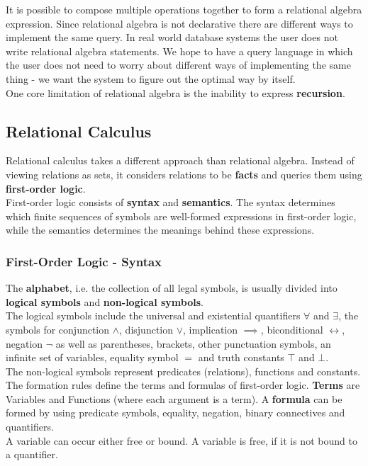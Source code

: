 It is possible to compose multiple operations together to form a relational algebra expression.
Since relational algebra is not declarative there are different ways to implement the same query. In real world database systems the user does not write relational algebra statements. We hope to have a query language in which the user does not need to worry about different ways of implementing the same thing - we want the system to figure out the optimal way by itself.\vspace{.2cm}\\
One core limitation of relational algebra is the inability to express \textbf{recursion}.

\subsection{Relational Calculus}
Relational calculus takes a different approach than relational algebra. Instead of viewing relations as sets, it considers relations to be \textbf{facts} and queries them using \textbf{first-order logic}.\vspace{.2cm}\\
First-order logic consists of \textbf{syntax} and \textbf{semantics}. The syntax determines which finite sequences of symbols are well-formed expressions in first-order logic, while the semantics determines the meanings behind these expressions. 

\subsubsection{First-Order Logic - Syntax}
The \textbf{alphabet}, i.e. the collection of all legal symbols, is usually divided into \textbf{logical symbols} and \textbf{non-logical symbols}. \\
The logical symbols include the universal and existential quantifiers $\forall$ and $\exists$, the symbols for conjunction $\land$, disjunction $\lor$, implication $\implies$, biconditional $\leftrightarrow$, negation $\neg$ as well as parentheses, brackets, other punctuation symbols, an infinite set of variables, equality symbol $=$ and truth constants $\top$ and $\bot$.\\
The non-logical symbols represent predicates (relations), functions and constants. \\
The formation rules define the terms and formulas of first-order logic. \textbf{Terms} are Variables and Functions (where each argument is a term). A \textbf{formula} can be formed by using predicate symbols, equality, negation, binary connectives and quantifiers. \\
A variable can occur either free or bound. A variable is free, if it is not bound to a quantifier.

